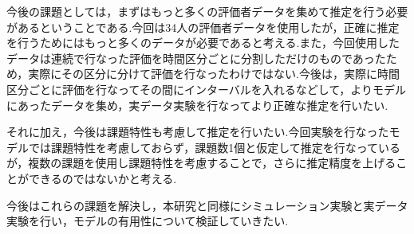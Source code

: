 \documentclass[a4paper,11pt,oneside,openany]{jsbook}
\begin{document}
今後の課題としては，まずはもっと多くの評価者データを集めて推定を行う必要があるということである.今回は34人の評価者データを使用したが，正確に推定を行うためにはもっと多くのデータが必要であると考える.また，今回使用したデータは連続で行なった評価を時間区分ごとに分割しただけのものであったため，実際にその区分に分けて評価を行なったわけではない.今後は，実際に時間区分ごとに評価を行なってその間にインターバルを入れるなどして，よりモデルにあったデータを集め，実データ実験を行なってより正確な推定を行いたい.

それに加え，今後は課題特性も考慮して推定を行いたい.今回実験を行なったモデルでは課題特性を考慮しておらず，課題数1個と仮定して推定を行なっているが，複数の課題を使用し課題特性を考慮することで，さらに推定精度を上げることができるのではないかと考える.

今後はこれらの課題を解決し，本研究と同様にシミュレーション実験と実データ実験を行い，モデルの有用性について検証していきたい.

\newpage



\end{document}
